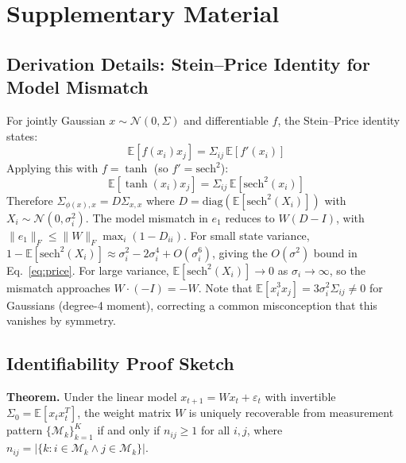 \documentclass{article}
\begin{document}



\newpage
\appendix
\section{Supplementary Material}
\label{sec:appendix}

\subsection{Derivation Details: Stein--Price Identity for Model Mismatch}
\label{sec:app_price}

For jointly Gaussian $x \sim \mathcal{N}(0, \Sigma)$ and differentiable $f$, the Stein--Price identity states:
\begin{equation}
    \mathbb{E}[f(x_i) x_j] = \Sigma_{ij} \, \mathbb{E}[f'(x_i)]
\end{equation}
Applying this with $f = \tanh$ (so $f' = \text{sech}^2$):
\begin{equation}
    \mathbb{E}[\tanh(x_i) x_j] = \Sigma_{ij} \, \mathbb{E}[\text{sech}^2(x_i)]
\end{equation}
Therefore $\Sigma_{\phi(x),x} = D \Sigma_{x,x}$ where $D = \text{diag}(\mathbb{E}[\text{sech}^2(X_i)])$ with $X_i \sim \mathcal{N}(0, \sigma_i^2)$.
The model mismatch in $e_1$ reduces to $W(D - I)$, with $\|e_1\|_F \leq \|W\|_F \max_i(1 - D_{ii})$.
For small state variance, $1 - \mathbb{E}[\text{sech}^2(X_i)] \approx \sigma_i^2 - 2\sigma_i^4 + O(\sigma_i^6)$, giving the $O(\sigma^2)$ bound in Eq.~\eqref{eq:price}.
For large variance, $\mathbb{E}[\text{sech}^2(X_i)] \to 0$ as $\sigma_i \to \infty$, so the mismatch approaches $W \cdot (-I) = -W$.
Note that $\mathbb{E}[x_i^3 x_j] = 3\sigma_i^2 \Sigma_{ij} \neq 0$ for Gaussians (degree-4 moment), correcting a common misconception that this vanishes by symmetry.

\subsection{Identifiability Proof Sketch}
\label{sec:app_ident}

\textbf{Theorem.} Under the linear model $x_{t+1} = Wx_t + \varepsilon_t$ with invertible $\Sigma_0 = \mathbb{E}[x_t x_t^T]$, the weight matrix $W$ is uniquely recoverable from measurement pattern $\{\mathcal{M}_k\}_{k=1}^K$ if and only if $n_{ij} \geq 1$ for all $i,j$, where $n_{ij} = |\{k : i \in \mathcal{M}_k \wedge j \in \mathcal{M}_k\}|$.
\end{document}
